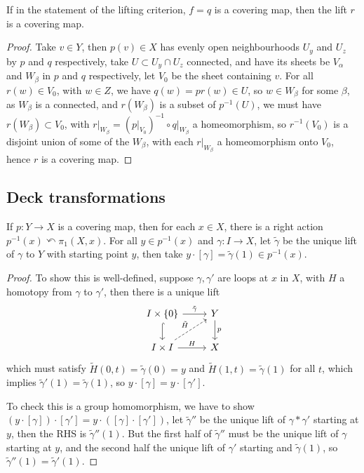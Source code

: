 \documentclass{article}
\begin{document}
\begin{proposition}
    If in the statement of the lifting criterion, $f=q$ is a covering map, then the lift $r$ is a covering map.
    \begin{proof}
        Take $v\in Y$, then $p(v)\in X$ has evenly open neighbourhoods $U_y$ and $U_z$ by $p$ and $q$ respectively, take $U\subset U_y\cap U_z$ connected, and have its sheets be $V_\alpha$ and $W_\beta$ in $p$ and $q$ respectively, let $V_0$ be the sheet containing $v$. For all $r(w)\in V_0$, with $w\in Z$, we have $q(w)=pr(w)\in U$, so $w\in W_\beta$ for some $\beta$, as $W_\beta$ is a connected, and $r(W_\beta)$ is a subset of $p^{-1}(U)$, we must have $r(W_\beta)\subset V_0$, with $r\vert_{W_\beta} = (p\vert_{V_0})^{-1}\circ q\vert_{W_\beta}$ a homeomorphism, so $r^{-1}(V_0)$ is a disjoint union of some of the $W_\beta$, with each $r\vert_{W_\beta}$ a homeomorphism onto $V_0$, hence $r$ is a covering map.
    \end{proof}
\end{proposition}

\subsection{Deck transformations}

\begin{theorem}
    If $p:Y\rightarrow X$ is a covering map, then for each $x\in X$, there is a right action $p^{-1}(x)\curvearrowleft \pi_1(X,x)$. For all $y\in p^{-1}(x)$ and $\gamma:I\rightarrow X$, let $\tilde{\gamma}$ be the unique lift of $\gamma$ to $Y$ with starting point $y$, then take $y\cdot [\gamma] = \tilde{\gamma}(1)\in p^{-1}(x)$.
    \begin{proof}
        To show this is well-defined, suppose $\gamma,\gamma'$ are loops at $x$ in $X$, with $H$ a homotopy from $\gamma$ to $\gamma'$, then there is a unique lift \[
        \begin{tikzcd}
            I\times \{0\} \arrow[r, "\tilde{\gamma}"] \arrow[d, hook] & Y \arrow[d, "p"] \\
            I\times I \arrow[ur, dashed, "\tilde{H}"] \arrow[r, "H"] & X
        \end{tikzcd}
        \] which must satisfy $\tilde{H}(0,t) = \tilde{\gamma}(0) = y$ and $\tilde{H}(1,t) = \tilde{\gamma}(1)$ for all $t$, which implies $\tilde{\gamma}'(1)=\tilde{\gamma}(1)$, so $y\cdot[\gamma]=y\cdot[\gamma']$.

        To check this is a group homomorphism, we have to show $(y\cdot [\gamma])\cdot[\gamma'] = y\cdot([\gamma]\cdot[\gamma'])$, let $\tilde{\gamma}''$ be the unique lift of $\gamma*\gamma'$ starting at $y$, then the RHS is $\tilde{\gamma}''(1)$. But the first half of $\tilde{\gamma}''$ must be the unique lift of $\gamma$ starting at $y$, and the second half the unique lift of $\gamma'$ starting and $\tilde{\gamma}(1)$, so $\tilde{\gamma}''(1)=\tilde{\gamma}'(1)$.
    \end{proof}
\end{theorem}
\end{document}
